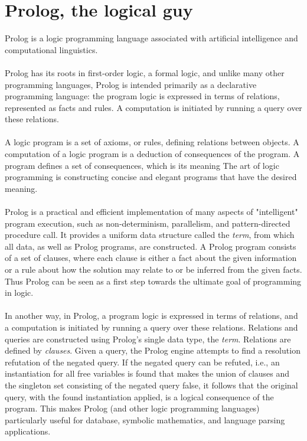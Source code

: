 \documentclass{report}
\theoremstyle{definition}
\theoremstyle{definition}
\begin{document}
\section{Prolog, the logical guy}
Prolog is a logic programming language associated with artificial intelligence and computational linguistics.\\\\
Prolog has its roots in first-order logic, a formal logic, and unlike many other programming languages, Prolog is intended primarily as a declarative programming language: the program logic is expressed in terms of relations, represented as facts and rules. A computation is initiated by running a query over these relations.\\\\
A logic program is a set of axioms, or rules, defining relations between objects. A computation of a logic program is a deduction of consequences of the program. A program defines a set of consequences, which is its meaning The art of logic programming is constructing concise and elegant programs that have the desired meaning.\\\\
Prolog is a practical and efficient implementation of many aspects of "intelligent" program execution, such as non-determinism, parallelism, and pattern-directed procedure call. It provides a uniform data structure called the \textit{term}, from which all data, as well as Prolog programs, are constructed. A Prolog program consists of a set of clauses, where each clause is either a fact about the given information or a rule about how the solution may relate to or be inferred from the given facts. Thus Prolog can be seen as a first step towards the ultimate goal of programming in logic.\\\\
In another way, in Prolog, a program logic is expressed in terms of relations, and a computation is initiated by running a query over these relations. Relations and queries are constructed using Prolog's single data type, the \textit{term}. Relations are defined by \textit{clauses}. Given a query, the Prolog engine attempts to find a resolution refutation of the negated query. If the negated query can be refuted, i.e., an instantiation for all free variables is found that makes the union of clauses and the singleton set consisting of the negated query false, it follows that the original query, with the found instantiation applied, is a logical consequence of the program. This makes Prolog (and other logic programming languages) particularly useful for database, symbolic mathematics, and language parsing applications.
\end{document}
